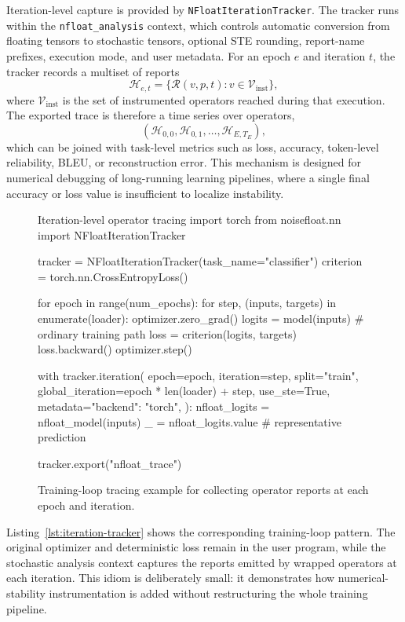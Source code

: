 \documentclass[manuscript, screen]{acmart}
\begin{document}
Iteration-level capture is provided by \texttt{NFloatIterationTracker}. The tracker runs within the \texttt{nfloat\_analysis} context, which controls automatic conversion from floating tensors to stochastic tensors, optional STE rounding, report-name prefixes, execution mode, and user metadata. For an epoch $e$ and iteration $t$, the tracker records a multiset of reports
\begin{equation}
\mathcal{H}_{e,t}=\{\mathcal{R}(v,p,t): v\in\mathcal{V}_{\mathrm{inst}}\},
\end{equation}
where $\mathcal{V}_{\mathrm{inst}}$ is the set of instrumented operators reached during that execution. The exported trace is therefore a time series over operators,
\begin{equation}
\left(\mathcal{H}_{0,0},\mathcal{H}_{0,1},\ldots,\mathcal{H}_{E,T_E}\right),
\end{equation}
which can be joined with task-level metrics such as loss, accuracy, token-level reliability, BLEU, or reconstruction error. This mechanism is designed for numerical debugging of long-running learning pipelines, where a single final accuracy or loss value is insufficient to localize instability.

\begin{figure}
\centering
\begin{pythoncode}[label={lst:iteration-tracker}]{Iteration-level operator tracing}
import torch
from noisefloat.nn import NFloatIterationTracker

tracker = NFloatIterationTracker(task_name="classifier")
criterion = torch.nn.CrossEntropyLoss()

for epoch in range(num_epochs):
    for step, (inputs, targets) in enumerate(loader):
        optimizer.zero_grad()
        logits = model(inputs)              # ordinary training path
        loss = criterion(logits, targets)
        loss.backward()
        optimizer.step()

        with tracker.iteration(
            epoch=epoch,
            iteration=step,
            split="train",
            global_iteration=epoch * len(loader) + step,
            use_ste=True,
            metadata={"backend": "torch"},
        ):
            nfloat_logits = nfloat_model(inputs)
            _ = nfloat_logits.value        # representative prediction

tracker.export("nfloat_trace")
\end{pythoncode}
\caption{Training-loop tracing example for collecting operator reports at each epoch and iteration.}
\end{figure}
Listing~\ref{lst:iteration-tracker} shows the corresponding training-loop pattern. The original optimizer and deterministic loss remain in the user program, while the stochastic analysis context captures the reports emitted by wrapped operators at each iteration. This idiom is deliberately small: it demonstrates how numerical-stability instrumentation is added without restructuring the whole training pipeline.
\end{document}
